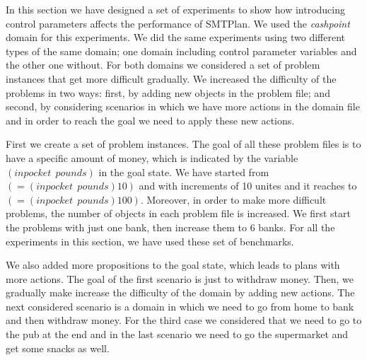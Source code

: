 In this section we have designed a set of experiments to show how introducing control parameters affects the performance of SMTPlan. We used the \textit{cashpoint} domain for this experiments. We did the same experiments using two different types of the same domain; one domain including control parameter variables and the other one without. For both domains we considered a set of problem instances that get more difficult gradually. We increased the difficulty of the problems in two ways: first, by adding new objects in the problem file; and second, by considering scenarios in which we have more actions in the domain file and in order to reach the goal we need to apply these new actions. 


First we create a set of problem instances. The goal of all these problem files is to have a specific amount of money, which is indicated by the variable  $(inpocket \ \ pounds)$ in the goal state. We have started from $( = (inpocket \ \ pounds) 10) $ and with increments of 10 unites and it reaches to  $( = (inpocket \ \ pounds) 100) $. Moreover, in order to make more difficult problems, the number of objects in each problem file is increased. We first start the problems with just one bank, then increase them to 6 banks. For all the experiments in this section, we have used these set of benchmarks. 

We also added more propositions to the goal state, which leads to plans with more actions. The goal of the first scenario is just to withdraw money. Then, we gradually make increase the difficulty of the domain by adding new actions. The next considered scenario is a domain in which we need to go from home to bank and then withdraw money. For the third case we considered that we need to go to the pub at the end and in the last scenario we need to go the supermarket and get some snacks as well. 




